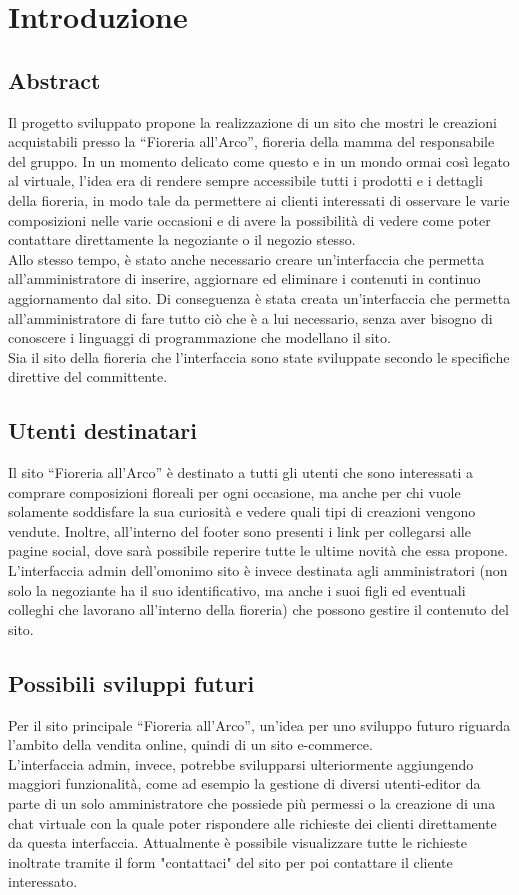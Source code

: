 \section{Introduzione}
\subsection{Abstract}
Il progetto sviluppato propone la realizzazione di un sito che mostri le creazioni acquistabili presso la “Fioreria all’Arco”, fioreria della mamma del responsabile del gruppo. In un momento delicato come questo e in un mondo ormai così legato al virtuale, l’idea era di rendere sempre accessibile tutti i prodotti e i dettagli della fioreria, in modo tale da permettere ai clienti interessati di osservare le varie composizioni nelle varie occasioni e di avere la possibilità di vedere come poter contattare direttamente la negoziante o il negozio stesso.\\
Allo stesso tempo, è stato anche necessario creare un’interfaccia che permetta all'amministratore di inserire, aggiornare ed eliminare i contenuti in continuo aggiornamento dal sito. Di conseguenza è stata creata un’interfaccia che permetta all’amministratore di fare tutto ciò che è a lui necessario, senza aver bisogno di conoscere i linguaggi di programmazione che modellano il sito. \\
Sia il sito della fioreria che l’interfaccia sono state sviluppate secondo le specifiche direttive del committente.


\subsection{Utenti destinatari}
Il sito “Fioreria all’Arco” è destinato a tutti gli utenti che sono interessati a comprare composizioni floreali per ogni occasione, ma anche per chi vuole solamente soddisfare la sua curiosità e vedere quali tipi di creazioni vengono vendute. 
Inoltre, all’interno del footer sono presenti i link per collegarsi alle pagine social, dove sarà possibile reperire tutte le ultime novità che essa propone.\\
L’interfaccia admin dell’omonimo sito è invece destinata agli amministratori (non solo la negoziante ha il suo identificativo, ma anche i suoi figli ed eventuali colleghi che lavorano all’interno della fioreria) che possono gestire il contenuto del sito.


\subsection{Possibili sviluppi futuri}
Per il sito principale “Fioreria all’Arco”, un’idea per uno sviluppo futuro riguarda l’ambito della vendita online, quindi di un sito e-commerce.\\
L’interfaccia admin, invece, potrebbe svilupparsi ulteriormente aggiungendo maggiori funzionalità, come ad esempio la gestione di diversi utenti-editor da parte di un solo amministratore che possiede più permessi o la creazione di una chat virtuale con la quale poter rispondere alle richieste dei clienti direttamente da questa interfaccia. Attualmente è possibile visualizzare tutte le richieste inoltrate tramite il form "contattaci" del sito per poi contattare il cliente interessato.
